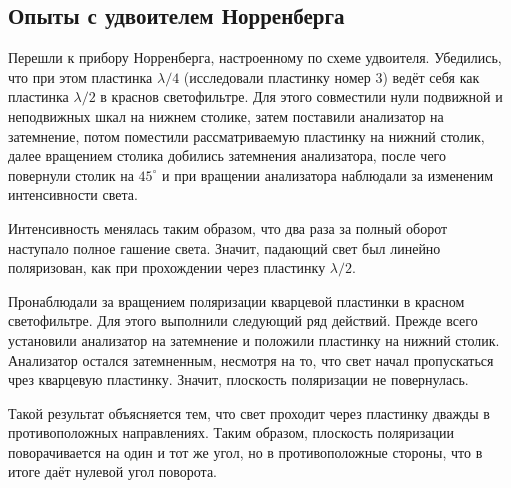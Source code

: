 \documentclass[12pt]{article}
\begin{document}
	\subsection{Опыты с удвоителем Норренберга}
	Перешли к прибору Норренберга, настроенному по схеме удвоителя. Убедились, что при этом пластинка $\lambda/4$ (исследовали пластинку номер 3) ведёт себя как пластинка $\lambda/2$ в краснов светофильтре. Для этого совместили нули подвижной и неподвижных шкал на нижнем столике, затем поставили анализатор на затемнение, потом поместили рассматриваемую пластинку на нижний столик, далее вращением столика добились затемнения анализатора, после чего повернули столик на $45^\circ$ и при вращении анализатора наблюдали за измененим интенсивности света.
	\par Интенсивность менялась таким образом, что два раза за полный оборот наступало полное гашение света. Значит, падающий свет был линейно поляризован, как при прохождении через пластинку $\lambda/2$.
	\\
	\par Пронаблюдали за вращением поляризации кварцевой пластинки в красном светофильтре. Для этого выполнили следующий ряд действий. Прежде всего установили анализатор на затемнение и положили пластинку на нижний столик. Анализатор остался затемненным, несмотря на то, что свет начал пропускаться чрез кварцевую пластинку. Значит, плоскость поляризации не повернулась.
	\par Такой результат объясняется тем, что свет проходит через пластинку дважды в противоположных направлениях. Таким образом, плоскость поляризации поворачивается на один и тот же угол, но в противоположные стороны, что в итоге даёт нулевой угол поворота.
\end{document}
